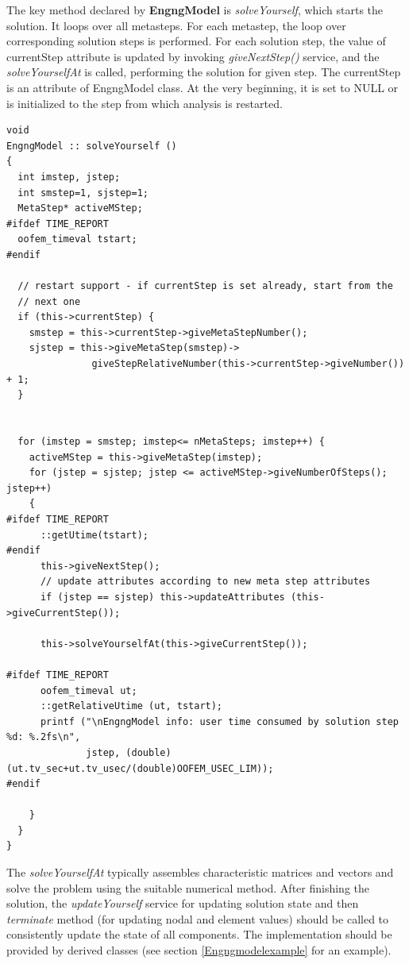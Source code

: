 \documentclass[a4paper]{article}
\newcommand{\class}[1]{{\bf #1}}
\newcommand{\service}[1]{{\em #1}}
\begin{document}
The key method declared by \class{EngngModel} is
\service{solveYourself}, which starts the solution. It loops over all
metasteps. For each metastep, the loop over corresponding solution steps is
performed. For each solution step, the value of currentStep attribute
is updated  by invoking \service{giveNextStep()} service, and
the \service{solveYourselfAt} is 
called, performing the solution for given step. The currentStep is
an attribute of EngngModel class. At the very beginning, it is set to
NULL or is initialized to the step from which analysis is restarted.

{\small\begin{verbatim}
void 
EngngModel :: solveYourself ()
{
  int imstep, jstep;
  int smstep=1, sjstep=1;
  MetaStep* activeMStep;
#ifdef TIME_REPORT
  oofem_timeval tstart;
#endif

  // restart support - if currentStep is set already, start from the
  // next one
  if (this->currentStep) {
    smstep = this->currentStep->giveMetaStepNumber();
    sjstep = this->giveMetaStep(smstep)->
               giveStepRelativeNumber(this->currentStep->giveNumber()) + 1;
  }


  for (imstep = smstep; imstep<= nMetaSteps; imstep++) {
    activeMStep = this->giveMetaStep(imstep);
    for (jstep = sjstep; jstep <= activeMStep->giveNumberOfSteps(); jstep++)
    {
#ifdef TIME_REPORT
      ::getUtime(tstart);
#endif
      this->giveNextStep();
      // update attributes according to new meta step attributes
      if (jstep == sjstep) this->updateAttributes (this->giveCurrentStep());
      
      this->solveYourselfAt(this->giveCurrentStep());

#ifdef TIME_REPORT
      oofem_timeval ut;
      ::getRelativeUtime (ut, tstart);
      printf ("\nEngngModel info: user time consumed by solution step %d: %.2fs\n", 
              jstep, (double)(ut.tv_sec+ut.tv_usec/(double)OOFEM_USEC_LIM));
#endif

    }
  }
}
\end{verbatim}}

The \service{solveYourselfAt} typically assembles characteristic matrices and vectors 
and solve the problem using the suitable numerical method. After
finishing the solution,
the \service{updateYourself} service for updating solution state and
then \service{terminate} method (for updating nodal and element
values) should be called to consistently update the state of all
components. The implementation should be provided by derived classes
(see section \ref{Engngmodelexample} for an example).
\end{document}
